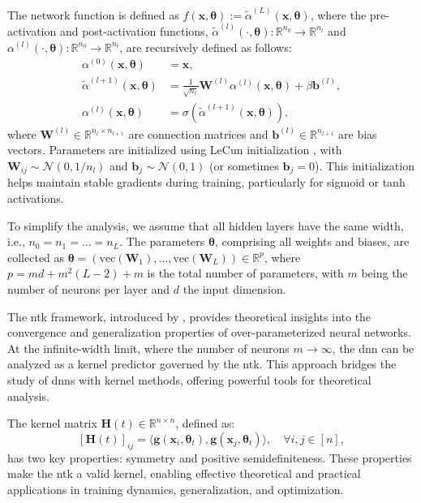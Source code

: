 The network function is defined as \( f(\mathbf{x}, \boldsymbol{\theta}) := \widetilde{\alpha}^{(L)}(\mathbf{x}, \boldsymbol{\theta}) \), where the pre-activation and post-activation functions, \( \widetilde{\alpha}^{(l)}(\cdot, \boldsymbol{\theta}) : \mathbb{R}^{n_0} \to \mathbb{R}^{n_l} \) and \( \alpha^{(l)}(\cdot, \boldsymbol{\theta}) : \mathbb{R}^{n_0} \to \mathbb{R}^{n_l} \), are recursively defined as follows:
\[
\begin{aligned}
    \alpha^{(0)} (\mathbf{x}, \boldsymbol{\theta}) &= \mathbf{x}, \\
    \widetilde{\alpha}^{(l+1)} (\mathbf{x}, \boldsymbol{\theta}) &= \frac{1}{\sqrt{n_l}} \mathbf{W}^{(l)} \alpha^{(l)}(\mathbf{x}, \boldsymbol{\theta}) + \beta \mathbf{b}^{(l)}, \\
    \alpha^{(l)} (\mathbf{x}, \boldsymbol{\theta}) &= \sigma(\widetilde{\alpha}^{(l+1)} (\mathbf{x}, \boldsymbol{\theta})),
\end{aligned}
\]
where \( \mathbf{W}^{(l)} \in \mathbb{R}^{n_l \times n_{l+1}} \) are connection matrices and \( \mathbf{b}^{(l)} \in \mathbb{R}^{n_{l+1}} \) are bias vectors. Parameters are initialized using LeCun initialization \cite{lecun2002efficient}, with \( \mathbf{W}_{ij} \sim \mathcal{N}(0, 1/n_l) \) and \( \mathbf{b}_j \sim \mathcal{N}(0, 1) \) (or sometimes \( \mathbf{b}_j = 0 \)). This initialization helps maintain stable gradients during training, particularly for sigmoid or tanh activations.

To simplify the analysis, we assume that all hidden layers have the same width, i.e., \( n_0 = n_1 = \ldots = n_L \). The parameters \( \boldsymbol{\theta} \), comprising all weights and biases, are collected as \( \boldsymbol{\theta} = (\mathrm{vec}(\mathbf{W}_1), \ldots, \mathrm{vec}(\mathbf{W}_L)) \in \mathbb{R}^p \), where \( p = md + m^2(L-2) + m \) is the total number of parameters, with \( m \) being the number of neurons per layer and \( d \) the input dimension.

The \ac{ntk} framework, introduced by \citet{jacot2018neural}, provides theoretical insights into the convergence and generalization properties of over-parameterized neural networks. At the infinite-width limit, where the number of neurons \( m \to \infty \), the \ac{dnn} can be analyzed as a kernel predictor governed by the \ac{ntk}. This approach bridges the study of \acp{dnn} with kernel methods, offering powerful tools for theoretical analysis.

The kernel matrix \(\mathbf{H}(t) \in \mathbb{R}^{n \times n}\), defined as:
\[
[\mathbf{H}(t)]_{ij} = \langle \mathbf{g}(\mathbf{x}_i, \boldsymbol{\theta}_t), \mathbf{g}(\mathbf{x}_j, \boldsymbol{\theta}_t) \rangle, \quad \forall i, j \in [n],
\]
has two key properties: symmetry and positive semidefiniteness. These properties make the \ac{ntk} a valid kernel, enabling effective theoretical and practical applications in training dynamics, generalization, and optimization. 

